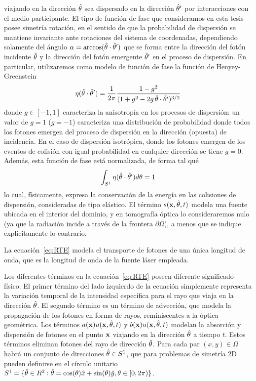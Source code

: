 viajando en la dirección $\hat{\theta}$ sea dispersado en la dirección $\hat{\theta}'$ 
por interacciones con el medio participante. El tipo de función 
de fase que consideramos en esta tesis posee simetría rotación, 
en el sentido de que la probabilidad de dispersión se mantiene invariante 
ante rotaciones del sistema de coordenadas, dependiendo solamente 
del ángulo $\alpha=\arccos(\hat{\theta} \cdot \hat{\theta}')$ que se forma entre la dirección 
del fotón incidente $\hat{\theta}$ y la dirección del fotón emergente $\hat{\theta}'$ 
en el proceso de dispersión. En particular, utilizaremos como modelo de función de fase la 
función de Henyey-Greenstein~\cite{Henyey1941}
\begin{equation}
\eta(\hat{\theta}\cdot\hat{\theta}')=\frac{1}{2\pi} 
\frac{1-g^2}{(1+g^2-2g \, \hat{\theta} \cdot \hat{\theta}')^{3/2}}
\label{eq:Henyey-Greeinstein}
\end{equation}
donde $g \in [-1,1]$ caracteriza la anisotropía en los procesos de dispersión: 
 un valor de $g=1$ ($g=-1$) caracteriza una distribución de probabilidad donde todos
los fotones emergen del proceso de dispersión en la dirección (opuesta) de 
incidencia. En el caso de dispersión isotrópica, 
donde los fotones emergen de los eventos de colisión con igual probabilidad 
en cualquier dirección se tiene $ g = 0 $. Además, esta función de fase 
está normalizada, de forma tal qué
\begin{equation}
\int_{S^1}\eta(\hat{\theta}\cdot\hat{\theta}') d\theta=1
\label{eq:Henyey-Greeinsteinnorm}
\end{equation}
lo cual, físicamente, expresa la conservación de la energía en las colisiones 
de dispersión, consideradas de tipo elástico. El término $ s(\mathbf{x},\hat{\theta},t)$ 
modela una fuente ubicada en el interior del dominio, y en tomografía óptica 
lo consideraremos nulo (ya que la radiación incide a través de la frontera $\partial \Omega$), 
a menos que se indique explícitamente lo contrario. 

La ecuación~\eqref{eq:RTE} 
modela el transporte de fotones de una única longitud de onda, que es la longitud 
de onda de la fuente láser empleada.

Los diferentes términos en la ecuación~\eqref{eq:RTE} poseen 
diferente significado físico. El primer término del lado izquierdo de la ecuación simplemente representa la variación temporal  
de la intensidad específica para el rayo que viaja en la dirección $\hat{\theta}$. 
El segundo término es un término de advección, que modela la propagación de 
los fotones en forma de rayos, reminiscentes a la óptica geométrica. Los términos $a(\mathbf{x})u(\mathbf{x},\hat{\theta},t)$ y $b(\mathbf{x})u(\mathbf{x},\hat{\theta},t)$ modelan la 
absorción y dispersión de fotones 
en el punto $\mathbf{x}$ viajando en la dirección $\hat{\theta}$ a tiempo $t$. Estos términos eliminan 
fotones del rayo de dirección $\hat{\theta}$. 
Para cada par $(x,y)\in \Omega$ habrá un conjunto de direcciones $\hat{\theta} \in S^1$, 
que para problemas de simetría 2D 
pueden definirse en el círculo unitario $S^1=\{ \hat{\theta} \in R^2: 
\hat{\theta}=\cos(\theta)\hat x+\sin(\theta) \hat y, \theta \in [0,2\pi)  \}$. 

